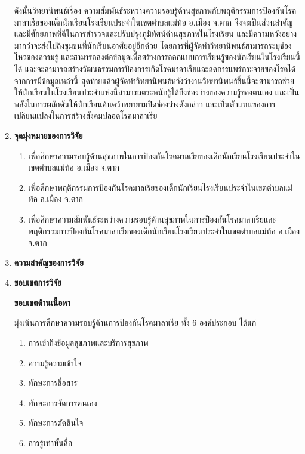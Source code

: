 \begin{titlepage}
\begin{enumerate}
          ดังนั้นวิทยานิพนธ์เรื่อง ความสัมพันธ์ระหว่างความรอบรู้ด้านสุขภาพกับพฤติกรรมการป้องกันโรคมาลาเรียของเด็กนักเรียนโรงเรียนประจำในเขตตำบลแม่ท้อ อ.เมือง จ.ตาก จึงจะเป็นส่วนสำคัญ และมีศักยภาพที่ดีในการสำรวจและปรับปรุงภูมิทัศน์ด้านสุขภาพในโรงเรียน และมีความหวังอย่างมากว่าจะส่งไปถึงชุมชนที่นักเรียนอาศัยอยู่อีกด้วย โดยการที่ผู้จัดทำวิทยานิพนธ์สามารถระบุช่องโหว่ของความรู้ และสามารถส่งต่อข้อมูลเพื่อสร้างการออกแบบการเรียนรู้ของนักเรียนในโรงเรียนนี้ได้ และจะสามารถสร้างวัฒนธรรมการป้องการเกิดโรคมาลาเรียและลดการแพร่กระจายของโรคได้จากการมีข้อมูลเหล่านี้ สุดท้ายแล้วผู้จัดทำวิทยานิพนธ์หวังว่างานวิทยานิพนธ์ชิ้นนี้จะสามารถช่วยให้นักเรียนในโรงเรียนประจำแห่งนี้สามารถตระหนักรู้ได้ถึงช่องว่างของความรู้ของตนเอง และเป็นพลังในการผลักดันให้นักเรียนค้นคว้าพยายามปิดช่องว่างดังกล่าว และเป็นตัวแทนของการเปลี่ยนแปลงในการสร้างสังคมปลอดโรคมาลาเรีย


          \item\textbf{จุดมุ่งหมายของการวิจัย}
          \begin{enumerate}
            \item เพื่อศึกษาความรอบรู้ด้านสุขภาพในการป้องกันโรคมาลเรียของเด็กนักเรียนโรงเรียนประจำในเขตตำบลแม่ท้อ อ.เมือง จ.ตาก
            \item เพื่อศึกษาพฤติกรรมการป้องกันโรคมาลเรียของเด็กนักเรียนโรงเรียนประจำในเขตตำบลแม่ท้อ อ.เมือง จ.ตาก
            \item เพื่อศึกษาความสัมพันธ์ระหว่างความรอบรู้ด้านสุขภาพในการป้องกันโรคมาลาเรียและพฤติกรรมการป้องกันโรคมาลาเรียของเด็กนักเรียนโรงเรียนประจำในเขตตำบลแม่ท้อ อ.เมือง จ.ตาก
          \end{enumerate}

          \item\textbf{ความสำคัญของการวิจัย}

          \item\textbf{ขอบเขตการวิจัย}

          \textbf{ขอบเขตด้านเนื้อหา}

          มุ่งเน้นการศึกษาความรอบรู้ด้านการป้องกันโรคมาลาเรีย ทั้ง 6 องค์ประกอบ ได้แก่
          \begin{enumerate}[itemindent=4em, label=\textnormal{\arabic*.}]
            \item การเข้าถึงข้อมูลสุขภาพและบริการสุขภาพ
            \item ความรู้ความเข้าใจ
            \item ทักษะการสื่อสาร
            \item ทักษะการจัดการตนเอง
            \item ทักษะการตัดสินใจ
            \item การรู้เท่าทั้นสื่อ
          \end{enumerate}


\end{enumerate}
\end{titlepage}
